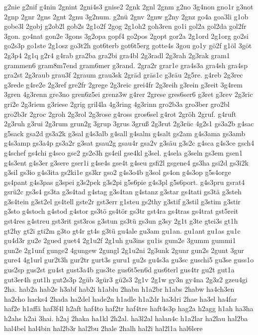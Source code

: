 {g2nie
g2nif
g4nin
2gnint
2gni4s3
gnise2
2gnk
2gnl
2gnm
g2no
3g4non
gno1r
g3not
2gnp
2gnr
2gns
2gnt
2gnu
3g2num.
g2nü
2gnv
2gnw
g2ny
2gnz
go4a
goa3li
g1ob
gobe3l
2gobj
g2ob2l
gob2s
2g1o2f
2gog
2g1oh2
goh3ren
go1i
gol2a
gol2da
gol2fr
3gon.
go4nat
gon2e
3gons
3g2opa
gopf4
go2pos
2gopt
gor2a
2g1ord
2g1org
go2si
go2s3p
go1ste
2g1osz
go3t2h
got6terb
got6t5erg
gotte4s
3gou
go1y
gö2f
g1öl
3göt
2g3p4
2g1q
g2r4
g4rab
gra2ba
gra2bi
gra4bl
2g3radl
2g3rah
2g3rak
gram1
grammen6
gram8m7end
gram6mer
g3rand.
2gra2r
grar1e
gra4s3a
gra4sh
gra4sp
gra2st
2g3raub
grau3f
2graum
grau3sk
2gräd
gräs1c
g3räu
2g5re.
g4reb
2g3rec
g3rede
g4re2e
2g3ref
gre2fr
2grege
2g3reic
grei4fr
2g3reih
g3rein
g3reit
3g4rem
3gren
4g3renn
gre3no
gren6z5ei
grenz3w
g4rer
2grese
gres6ser6
g3ret
g3rev
2g3ric
gri2e
2g3riem
g3riese
2grig
gril4la
4g3ring
4g3rinn
gro2b3a
gro3ber
gro2bl
gro2b3r
2groc
2groh
2g3rol
2g3rose
g4ross
gros6sel
g4rot
2gröh
2gruf.
g4ruft
2g3ruh
g3rui
2g3rum
grun2g
3grup
3grus
3gruß
2g3rut
2g3rüc
4g2s1
gs3a2b
g4sac
g5sack
gsa2d
gs3a2k
g3sal
g4s3alb
g4sall
g4salm
g4salt
gs2am
g4s3ama
gs3amb
g4s3amp
gs3a4p
gs3a2r
g3sat
gsau2g
gsau4r
gsa2v
g3säu
g3s2c
g4sca
g4s3ce
gsch4
g4schef
gs4chi
g4sco
gse2
gs2e3h
gs4eil
gse4kl
g3sel.
g4sela
g3seln
gs3em
gsen1
g4s3ent
g4s3er
g3sere
gser1i
g4se4s
gse4t
g4seu
gsfi2l
gsgene4
gs3ha
gsi2d
gs3i2k
g3sil
gs3io
g4s3ita
gs2ki1e
gs3kr
gso2
g4s3o4b
g3sol
gs4on
g4s3op
g5s4orge
gs4pant
g4s3pas
g3spei
g3s2pek
g3s2pi
g5s6pie
g4s3pl
g5s6port.
g4s3pru
gsrat4
gsrü2c
gs3s4
gs3ta
g3s4tad
g4stag
g3s4tan
g4stanz
g3star
gs4tati
gs3tä
g3steh
g3s4tein
g3st2el
gs4tell
gste2r
gst3err
g1steu
gs2thy
g3stif
g3stil
g3stim
g3stir
g3sto
g4stoch
g4stod
g4stor
gs3tö
gs4tör
gs3tr
gst4ra
gs4tras
gs4trat
gst5reit
gst4res
g4streu
gst3rit
gst3ros
g3stun
gs3tü
gs3un
g3sy
2g1t
g3te
gtei3s
gt1h
gt2hy
gt2i
gti2m
g3to
gt4r
gt4s
g3tü
gu4ale
gu3am
gu1an.
gu1ant
gu1as
gu1c
gu4d3r
gu2e
2gued
guet4
2g1u2f
2g1uh
gu3ins
gu1is
gum2e
3gumm
gummi1
gun2e
2g1unf
gunge2
4gungew
2gungl
2g1u2ni
2g3unk
2gunr
gun2s
2gunt
3gur
gure4
4g1url
gur2t3h
gur2tr
gurt3s
guru1
gu2s
gu4s3a
gu3sc
guschi5
gu3se
guss1o
gus2sp
gus2st
gu4st
gust3a4b
gus3te
gus6t5en6d
gus6terl
gus4tr
gu2t
gut1a
gut3er4h
gut1h
gut2s3p
2güb
3gür3
gü2s3
2g1v
2g1w
gy3n
gy4na
2g3z2
gzeu4gi
2ha.
hab2a
hab2e
h3abf
hab2i
h1ablu
2habn
h1a2br
h1abs
2habw
ha4ch3en
ha2cho
hacks4
2hada
ha2del
hade2n
h1adle
h1a2dr
ha3dri
2hae
ha3el
ha4far
haf2e
h1affä
haf3f4l
h2aft
haf4to
haf2tr
haf4tre
haft4s3p
hag2a
h2agg
h1ah
ha3ha
h2ahs
h2ai
3hai.
h2aj
2haka
ha1kl
2h2al.
ha3l2al
halan4c
h1a2lar
ha2lau
hal2ba
hal4bel
hal4bin
hal2b3r
hal2bu
2hale
2halh
hal2i
hal2l1a
hal6lere
}
